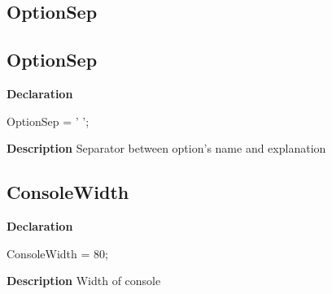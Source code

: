\documentclass{report}
\newif\ifpdf
\begin{document}
\subsection*{\large{\textbf{OptionSep}}\normalsize\hspace{1ex}\hrulefill}
\else
\subsection*{OptionSep}
\fi
\label{PasDoc_OptionParser-OptionSep}
\begin{list}{}{
\setlength{\itemindent}{0cm}
\setlength{\listparindent}{0cm}
\setlength{\leftmargin}{\evensidemargin}
\addtolength{\leftmargin}{\tmplength}
\settowidth{\labelsep}{X}
\addtolength{\leftmargin}{\labelsep}
\setlength{\labelwidth}{\tmplength}
}
\item[\textbf{Declaration}\hfill]
\ifpdf
\begin{flushleft}
\fi
\begin{ttfamily}
OptionSep = '  ';\end{ttfamily}

\ifpdf
\end{flushleft}
\fi

\par
\item[\textbf{Description}]
Separator between option's name and explanation

\end{list}
\ifpdf
\subsection*{\large{\textbf{ConsoleWidth}}\normalsize\hspace{1ex}\hrulefill}
\else
\subsection*{ConsoleWidth}
\fi
\label{PasDoc_OptionParser-ConsoleWidth}
\begin{list}{}{
\setlength{\itemindent}{0cm}
\setlength{\listparindent}{0cm}
\setlength{\leftmargin}{\evensidemargin}
\addtolength{\leftmargin}{\tmplength}
\settowidth{\labelsep}{X}
\addtolength{\leftmargin}{\labelsep}
\setlength{\labelwidth}{\tmplength}
}
\item[\textbf{Declaration}\hfill]
\ifpdf
\begin{flushleft}
\fi
\begin{ttfamily}
ConsoleWidth = 80;\end{ttfamily}

\ifpdf
\end{flushleft}
\fi

\par
\item[\textbf{Description}]
Width of console

\end{list}
\end{document}
